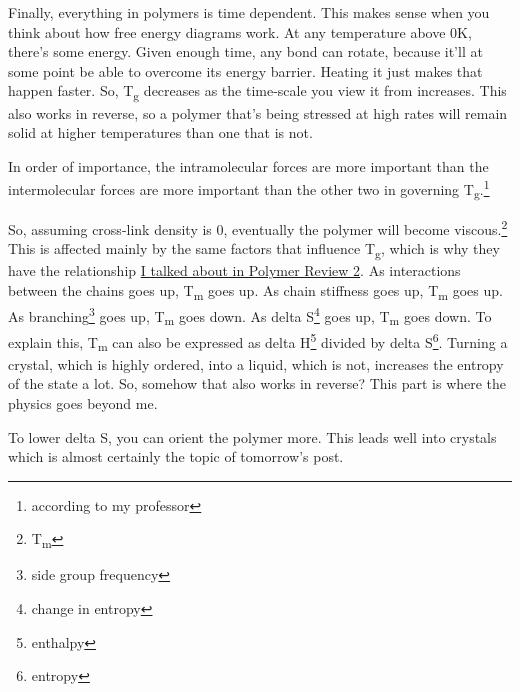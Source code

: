 \documentclass[12pt]{article}[titlepage]
\newcommand{\1}{\={a}}
\newcommand{\2}{\={e}}
\newcommand{\3}{\={\i}}
\newcommand{\4}{\=o}
\newcommand{\5}{\=u}
\newcommand{\6}{\={A}}
\newcommand{\sub}[1]{\textsubscript{#1}}
\renewcommand{\,}{\textsuperscript{,}}
\begin{document}
Finally, everything in polymers is time dependent.
This makes sense when you think about how free energy diagrams work.
At any temperature above 0K, there's some energy.
Given enough time, any bond can rotate, because it'll at some point be able to overcome its energy barrier.
Heating it just makes that happen faster.
So, T\sub{g} decreases as the time-scale you view it from increases.
This also works in reverse, so a polymer that's being stressed at high rates will remain solid at higher temperatures than one that is not.

In order of importance, the intramolecular forces are more important than the intermolecular forces are more important than the other two in governing T\sub{g}.\footnote{according to my professor}

So, assuming cross-link density is 0, eventually the polymer will become viscous.\footnote{T\sub{m}}
This is affected mainly by the same factors that influence T\sub{g}, which is why they have the relationship \href{polymer-2.html}{I talked about in Polymer Review 2}.
As interactions between the chains goes up, T\sub{m} goes up.
As chain stiffness goes up, T\sub{m} goes up.
As branching\footnote{side group frequency} goes up, T\sub{m} goes down.
As delta S\footnote{change in entropy} goes up, T\sub{m} goes down.
To explain this, T\sub{m} can also be expressed as delta H\footnote{enthalpy} divided by delta S\footnote{entropy}.
Turning a crystal, which is highly ordered, into a liquid, which is not, increases the entropy of the state a lot.
So, somehow that also works in reverse?
This part is where the physics goes beyond me.

To lower delta S, you can orient the polymer more.
This leads well into crystals which is almost certainly the topic of tomorrow's post.
\end{document}
